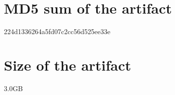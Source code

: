\documentclass[a4paper,UKenglish, authorcolumns]{darts-v2021}
\newcommand{\mdsum}[1]{{\section{MD5 sum of the artifact}#1}}
\newcommand{\artifactsize}[1]{{\section{Size of the artifact}#1}}
\begin{document}
\mdsum{224d1336264a5fd07c2cc56d525ee33e}

\artifactsize{3.0GB}











\end{document}
